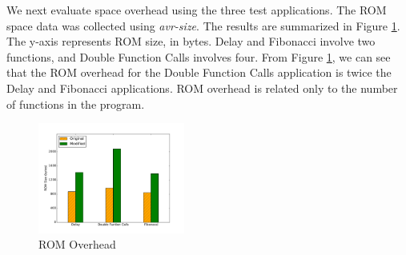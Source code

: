 We next evaluate space overhead using the three test applications. The ROM space data was collected using \textit{avr-size}. The results are summarized in Figure \ref{fig:space_overhead}. The y-axis represents ROM size, in bytes. Delay and Fibonacci involve two functions, and Double Function Calls involves four. From Figure \ref{fig:space_overhead}, we can see that the ROM overhead for the Double Function Calls application is twice the Delay and Fibonacci applications. ROM overhead is related only to the number of functions in the program.

\begin{figure}
\centering
\includegraphics[width=0.43\textwidth]{figures/space_overhead.pdf}
\caption{ROM Overhead}
\vspace{-10pt}
\label{fig:space_overhead}
\end{figure}

